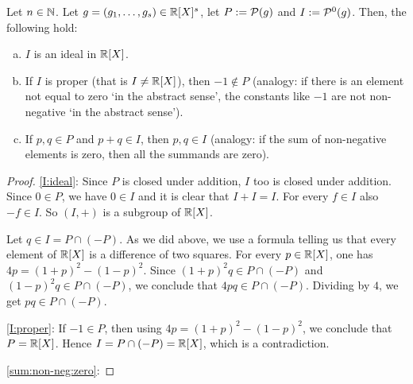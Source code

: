 \begin{lemma}
	\label{lem:ideals}
	Let $n \in \mathbb{N}$. Let $g=(g_1,\ldots,g_s) \in \mathbb{R}[X]^s$, let $P:=\mathcal{P}(g)$ and $I:=\mathcal{P}^0(g)$. Then, the following hold: 
	\begin{enumerate}[(a)]
		\item \label{I:ideal} $I$ is an ideal in $\mathbb{R}[X]$.
		\item \label{I:proper} If $I$ is proper (that is $I \ne \mathbb{R}[X]$), then $-1 \not\in P$ (analogy: if there is an element not equal to zero `in the abstract sense', the constants like $-1$ are not non-negative `in the abstract sense').
		\item \label{sum:non-neg:zero} If $p, q \in P$ and $p+q \in I$, then $p, q \in I$ (analogy: if the sum of non-negative elements is zero, then all the summands are zero). 
	\end{enumerate}
\end{lemma}
\begin{proof}
 \eqref{I:ideal}: Since $P$ is closed under addition, $I$ too is closed under addition. Since $0 \in P$, we have $0 \in I$ and it is clear that $I + I = I$. For every $f \in I$ also $-f \in I$. So $(I,+)$ is a subgroup of $\mathbb{R}[X]$.
 
 Let $q \in I = P \cap (-P)$. As we did above, we use a formula telling us that every element of $\mathbb{R}[X]$ is a difference of two squares.
  For every $p \in \mathbb{R}[X]$, one has $ 4 p = (1+p)^2 - (1-p)^2$. Since $(1+p)^2 q \in P \cap (-P)$ and $(1-p)^2 q \in P \cap (-P)$, we conclude that $4 p q \in P \cap (-P)$.
  Dividing by $4$, we get $p q \in P \cap (-P)$.
 
 \eqref{I:proper}: If $-1 \in P$, then using $ 4 p = (1+p)^2 - (1-p)^2$, we conclude that $P = \mathbb{R}[X]$. Hence $I=P \cap (-P) = \mathbb{R}[X]$, which is a contradiction. 
 
 \eqref{sum:non-neg:zero}:
\end{proof}

